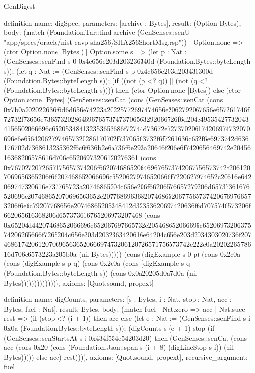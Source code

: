 \begin{lexlean}{GenDigest}
\begin{semanticmodule}
definition{
  name: digSpec,
  parameters: [archive : Bytes],
  result: (Option Bytes),
  body: (match (Foundation.Tar::find archive (GenSenses::senU "app/specs/oracle/nist-cavp-sha256/SHA256ShortMsg.rsp"))
    | Option.none => (ctor Option.none [Bytes])
    | Option.some s => (let p : Nat := (GenSenses::senFind s 0 0x4c656e203d203236340d (Foundation.Bytes::byteLength s)); (let q : Nat := (GenSenses::senFind s p 0x4c656e203d203430300d (Foundation.Bytes::byteLength s)); (if ((not (p <? q)) || (not (q <? (Foundation.Bytes::byteLength s)))) then (ctor Option.none [Bytes]) else (ctor Option.some [Bytes] (GenSenses::senCat (cons (GenSenses::senCat (cons 0x7b0a202022636f6d6d656e74223a20225772697474656e2062792067656e657261746f72732f73656e736573202864696765737473706563292066726f6d204e495354277320434156502066696c652053484132353653686f72744d73672e727370206174206974732070696e6e656420627974657320286170702f73706563732f6f7261636c652f6e6973742d636176702d7368613235362f6c6f636b2e6a736f6e293a20646f206e6f7420656469742e2045616368206578616d706c65206973206120276361 (cons 0x7670272072657175657374206f6620746865206469676573742067756573742c2061207069656365206f66207468652066696c65206279746520666f7220627974652c20616e642069747320616e737765723a20746865204c656e206f66206576657279206d65737361676520696e207468652070696563652c20776869636820746865206775657374206769766573206f6e6c79207768656e20746865205348412d32353620697420636f6d7075746573206f662065616368206d657373616765206973207468 (cons 0x65204d44207468652066696c652067697665732e205468652066696c6520697320637574206265666f7265204c656e203d2032363420616e64204c656e203d2034303020736f207468617420612070696563652066697473206120726571756573742e222c0a2020226578616d706c6573223a205b0a (nil Bytes))))) (cons (digExample s 0 p) (cons 0x2c0a (cons (digExample s p q) (cons 0x2c0a (cons (digExample s q (Foundation.Bytes::byteLength s)) (cons 0x0a20205d0a7d0a (nil Bytes)))))))))))))),
  axioms: [Quot.sound, propext]
}

definition{
  name: digCounts,
  parameters: [s : Bytes, i : Nat, stop : Nat, acc : Bytes, fuel : Nat],
  result: Bytes,
  body: (match fuel
    | Nat.zero => acc
    | Nat.succ rest => (if (stop <? (i + 1)) then acc else (let e : Nat := (GenSenses::senFind s i 0x0a (Foundation.Bytes::byteLength s)); (digCounts s (e + 1) stop (if (GenSenses::senStartsAt s i 0x434f554e54203d20) then (GenSenses::senCat (cons acc (cons 0x20 (cons (Foundation.Json::span s (i + 8) (digLineStop s i)) (nil Bytes))))) else acc) rest)))),
  axioms: [Quot.sound, propext],
  recursive_argument: fuel
}


\end{semanticmodule}
\end{lexlean}
